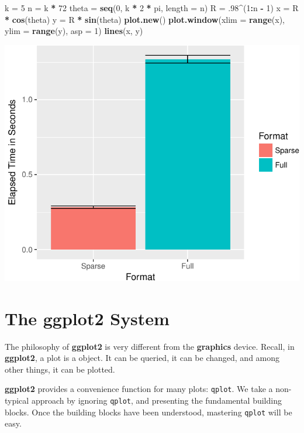 \documentclass[]{book}
\newenvironment{Shaded}{\begin{snugshade}}{\end{snugshade}}
\newcommand{\KeywordTok}[1]{\textcolor[rgb]{0.13,0.29,0.53}{\textbf{#1}}}
\newcommand{\DataTypeTok}[1]{\textcolor[rgb]{0.13,0.29,0.53}{#1}}
\newcommand{\DecValTok}[1]{\textcolor[rgb]{0.00,0.00,0.81}{#1}}
\newcommand{\StringTok}[1]{\textcolor[rgb]{0.31,0.60,0.02}{#1}}
\newcommand{\OperatorTok}[1]{\textcolor[rgb]{0.81,0.36,0.00}{\textbf{#1}}}
\newcommand{\NormalTok}[1]{#1}
\theoremstyle{definition}
\theoremstyle{definition}
\theoremstyle{definition}
\theoremstyle{remark}
\begin{document}
\begin{Shaded}
\begin{Highlighting}[]
\NormalTok{k =}\StringTok{ }\DecValTok{5}
\NormalTok{n =}\StringTok{ }\NormalTok{k }\OperatorTok{*}\StringTok{ }\DecValTok{72}
\NormalTok{theta =}\StringTok{ }\KeywordTok{seq}\NormalTok{(}\DecValTok{0}\NormalTok{, k }\OperatorTok{*}\StringTok{ }\DecValTok{2} \OperatorTok{*}\StringTok{ }\NormalTok{pi, }\DataTypeTok{length =}\NormalTok{ n)}
\NormalTok{R =}\StringTok{ }\NormalTok{.}\DecValTok{98}\OperatorTok{^}\NormalTok{(}\DecValTok{1}\OperatorTok{:}\NormalTok{n }\OperatorTok{-}\StringTok{ }\DecValTok{1}\NormalTok{)}
\NormalTok{x =}\StringTok{ }\NormalTok{R }\OperatorTok{*}\StringTok{ }\KeywordTok{cos}\NormalTok{(theta)}
\NormalTok{y =}\StringTok{ }\NormalTok{R }\OperatorTok{*}\StringTok{ }\KeywordTok{sin}\NormalTok{(theta)}
\KeywordTok{plot.new}\NormalTok{()}
\KeywordTok{plot.window}\NormalTok{(}\DataTypeTok{xlim =} \KeywordTok{range}\NormalTok{(x), }\DataTypeTok{ylim =} \KeywordTok{range}\NormalTok{(y), }\DataTypeTok{asp =} \DecValTok{1}\NormalTok{)}
\KeywordTok{lines}\NormalTok{(x, y)}
\end{Highlighting}
\end{Shaded}

\includegraphics[width=0.5\linewidth]{Rcourse_files/figure-latex/unnamed-chunk-283-1}

\section{The ggplot2 System}\label{the-ggplot2-system}

The philosophy of \textbf{ggplot2} is very different from the
\textbf{graphics} device. Recall, in \textbf{ggplot2}, a plot is a
object. It can be queried, it can be changed, and among other things, it
can be plotted.

\textbf{ggplot2} provides a convenience function for many plots:
\texttt{qplot}. We take a non-typical approach by ignoring
\texttt{qplot}, and presenting the fundamental building blocks. Once the
building blocks have been understood, mastering \texttt{qplot} will be
easy.
\end{document}
